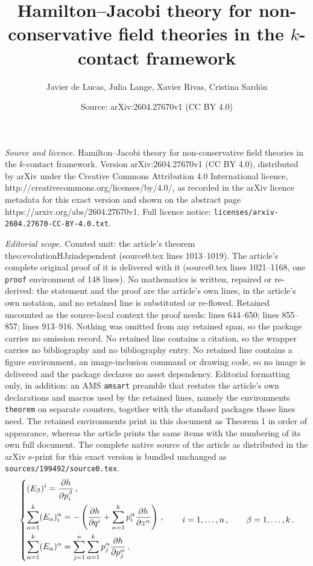 \documentclass[10pt,a4paper]{amsart}
\title{Hamilton--Jacobi theory for non-conservative field theories in the $k$-contact framework}
\author{Javier de Lucas, Julia Lange, Xavier Rivas, Cristina Sard\'on}
\date{Source: arXiv:2604.27670v1 (CC BY 4.0)}
\begin{document}
\maketitle

\noindent\emph{Source and licence.} Hamilton--Jacobi theory for non-conservative field theories in the $k$-contact framework. Version arXiv:2604.27670v1 (CC BY 4.0), distributed by arXiv under the Creative Commons Attribution 4.0 International licence, http://creativecommons.org/licenses/by/4.0/, as recorded in the arXiv licence metadata for this exact version and shown on the abstract page https://arxiv.org/abs/2604.27670v1. Full licence notice: \texttt{licenses/arxiv-2604.27670-CC-BY-4.0.txt}.\par\smallskip

\noindent\textit{Editorial scope.} Counted unit: the article's theorem theo:evolutionHJzindependent (source0.tex lines 1013--1019). The article's complete original proof of it is delivered with it (source0.tex lines 1021--1168, one \texttt{proof} environment of 148 lines). No mathematics is written, repaired or re-derived: the statement and the proof are the article's own lines, in the article's own notation, and no retained line is substituted or re-flowed.  Retained uncounted as the source-local context the proof needs: lines 644--650; lines 855--857; lines 913--916.  Nothing was omitted from any retained span, so the package carries no omission record.  No retained line contains a citation, so the wrapper carries no bibliography and no bibliography entry.  No retained line contains a figure environment, an image-inclusion command or drawing code, so no image is delivered and the package declares no asset dependency.  Editorial formatting only, in addition: an AMS \texttt{amsart} preamble that restates the article's own declarations and macros used by the retained lines, namely the environments \texttt{theorem} on separate counters, together with the standard packages those lines need.  The retained environments print in this document as Theorem 1 in order of appearance, whereas the article prints the same items with the numbering of its own full document.  The complete native source of the article as distributed in the arXiv e-print for this exact version is bundled unchanged as \texttt{sources/199492/source0.tex}.
\begin{equation}\label{eq:k-contact-HdDW-fields-Darboux-coordinates}
\begin{dcases}
(E_\beta)^i = \parder{h}{p_i^\beta}\,,\\
\sum_{\alpha=1}^k  (E_\alpha)^\alpha_i = -\left( \parder{h}{q^i} + \sum_{\alpha=1}^k  p_i^\alpha\parder{h}{z^\alpha} \right)\,,\\
\sum_{\alpha=1}^k  (E_\alpha)^\alpha = \sum_{j=1}^n  \sum_{\alpha=1}^k  p_j^\alpha\parder{h}{p_j^\alpha}\,.
\end{dcases}\qquad i=1,\dotsc,n\,,\qquad \beta=1,\dotsc,k\,.
\end{equation}
\end{document}
